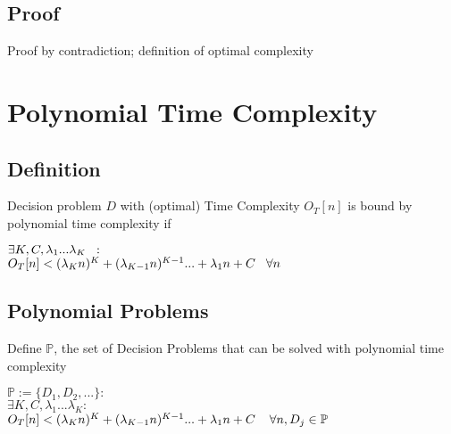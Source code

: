 \documentclass[11pt]{article}
\begin{document}
\subsection{Proof}
Proof by contradiction; definition of optimal complexity


















\section{Polynomial Time Complexity}

\subsection{Definition}
Decision problem $D$ with (optimal) Time Complexity $O_T[n]$ is bound by polynomial time complexity if
\begin{center}
$\exists K,C,\lambda_1...\lambda_K \hspace{2mm} :$
\\ \vspace{2mm}
$O_T[n] < (\lambda_K n)^K + (\lambda_{K-1} n)^{K-1}... + \lambda_1 n + C \hspace{3mm} \forall n$
\end{center}








\subsection{Polynomial Problems}
Define $\mathbb{P}$, the set of Decision Problems that can be solved with polynomial time complexity
\begin{center}
$
\mathbb{P} := \{D_1,D_2,...\} : 
$
\\
$
\exists K,C,\lambda_1...\lambda_K : 
$
\\
$
O_T[n] < (\lambda_K n)^K + (\lambda_{K-1} n)^{K-1}... + \lambda_1 n + C \hspace{4mm} \forall n, D_j \in \mathbb{P}
$
\end{center}
\end{document}
